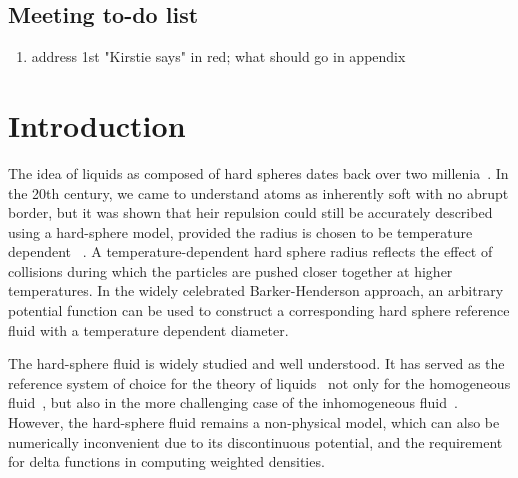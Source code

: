 \documentclass[letterpaper,twocolumn,amsmath,amssymb,prb]{revtex4-1}
\begin{document}
\subsection{Meeting to-do list}
\begin{enumerate}
\item address 1st "Kirstie says" in red; what should go in appendix
\end{enumerate}


\section{Introduction}
The idea of liquids as composed of hard spheres dates back over two
millenia~\cite{lucretius}.  In the 20th century, we came to understand
atoms as inherently soft with no abrupt border, but it was shown that 
heir repulsion could still be accurately described using a hard-sphere 
model, provided the radius is chosen to be temperature dependent
~\cite{rowlinson1964statistical, barker1967perturbation,
andersen1971relationship}. A temperature-dependent hard sphere radius 
reflects the effect of collisions during which the particles are pushed 
closer together at higher temperatures. 
In the widely celebrated Barker-Henderson approach, an arbitrary 
potential function can be used to construct a corresponding 
hard sphere reference fluid with a temperature dependent diameter. 

The hard-sphere fluid is widely studied and well understood. It 
has served as the reference system of choice for the theory of
liquids~\cite{gil-villegas-1997-SAFT-VR, clark2006developing,
  lafitte2013accurate} not only for the homogeneous
fluid~\cite{carnahan1969equation}, but also in the more challenging
case of the inhomogeneous fluid~\cite{rosenfeld1989, rosenfeld1997, 
roth2002whitebear}.  However, the hard-sphere fluid remains a
non-physical model, which can also be numerically inconvenient due to its
discontinuous potential, and the requirement for delta functions in
computing weighted densities.
\end{document}

